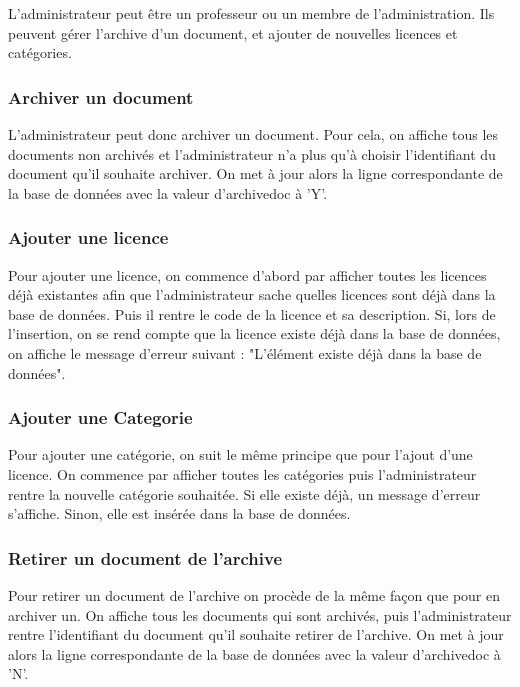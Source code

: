 \documentclass[11pt]{report}
\begin{document}
L'administrateur peut être un professeur ou un membre de l'administration. Ils peuvent gérer l'archive d'un document, et ajouter de nouvelles licences et catégories.

\subsubsection{Archiver un document}

L'administrateur peut donc archiver un document. Pour cela, on affiche tous les documents non archivés et l'administrateur n'a plus qu'à choisir l'identifiant du document qu'il souhaite archiver. On met à jour alors la ligne correspondante de la base de données avec la valeur d'archivedoc à 'Y'.

\subsubsection{Ajouter une licence}

Pour ajouter une licence, on commence d'abord par afficher toutes les licences déjà existantes afin que l'administrateur sache quelles licences sont déjà dans la base de données. Puis il rentre le code de la licence et sa description. Si, lors de l'insertion, on se rend compte que la licence existe déjà dans la base de données, on affiche le message d'erreur suivant : "L'élément existe déjà dans la base de données".

\subsubsection{Ajouter une Categorie}

Pour ajouter une catégorie, on suit le même principe que pour l'ajout d'une licence. On commence par afficher toutes les catégories puis l'administrateur rentre la nouvelle catégorie souhaitée. Si elle existe déjà, un message d'erreur s'affiche. Sinon, elle est insérée dans la base de données.

\subsubsection{Retirer un document de l'archive}

Pour retirer un document de l'archive on procède de la même façon que pour en archiver un. On affiche tous les documents qui sont archivés, puis l'administrateur rentre l'identifiant du document qu'il souhaite retirer de l'archive. On met à jour alors la ligne correspondante de la base de données avec la valeur d'archivedoc à 'N'.
\end{document}
